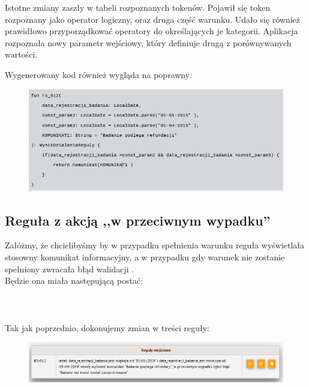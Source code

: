 Istotne zmiany zaszły w tabeli rozpoznanych tokenów. Pojawił się token rozpoznany jako operator logiczny, oraz druga część warunku. Udało się również prawidłowo przyporządkować operatory do określających je kategorii. Aplikacja rozpoznała nowy parametr wejściowy, który definiuje drugą z porównywanych wartości. 

Wygenerowany kod również wygląda na poprawny:
\begin{figure}[H]
	\centering
	\includegraphics[scale=0.8]{img/app-eksperymenty/p2-3.png}
\end{figure}

\subsection{Reguła z akcją ,,w przeciwnym wypadku''}
Załóżmy, że chcielibyśmy by  w przypadku spełnienia warunku reguła wyświetlała stosowny komunikat informacyjny, a w przypadku gdy warunek nie zostanie spełniony zwracała błąd walidacji . \\
Będzie ona miała następującą postać:
\\ \\
\\ \\
Tak jak poprzednio, dokonujemy zmian w treści reguły:
\begin{figure}[H]
	\centering
	\includegraphics[scale=0.8]{img/app-eksperymenty/p3-1.png}
\end{figure}

